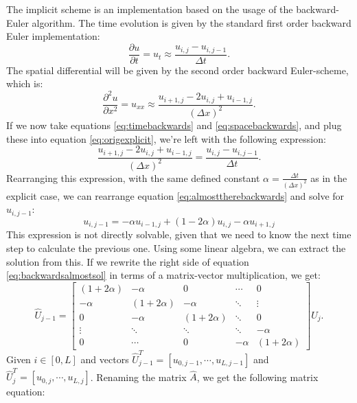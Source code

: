 \documentclass[reprint,english,notitlepage]{revtex4-1}  %
\begin{document}
The implicit scheme is an implementation based on the usage of the backward-Euler algorithm. The time evolution is given by the standard first order backward Euler implementation:
\begin{equation}\label{eq:timebackwards}
    \frac{\partial u}{\partial t} = u_t \approx \frac{u_{i,j} - u_{i,j-1}}{\Delta t}.
\end{equation}
The spatial differential will be given by the second order backward Euler-scheme, which is:
\begin{equation}\label{eq:spacebackwards}
    \frac{\partial^2 u}{\partial x^2} = u_{xx} \approx \frac{u_{i+1,j} - 2u_{i,j} + u_{i-1,j}}{(\Delta x)^2}.
\end{equation}
If we now take equations \ref{eq:timebackwards} and \ref{eq:spacebackwards}, and plug these into equation \ref{eq:origexplicit}, we're left with the following expression:
\begin{equation}\label{eq:almosttherebackwards}
    \frac{u_{i+1,j} - 2u_{i,j} + u_{i-1,j}}{(\Delta x)^2} = \frac{u_{i,j} - u_{i,j-1}}{\Delta t}.
\end{equation}
Rearranging this expression, with the same defined constant $\alpha = \frac{\Delta t}{(\Delta x)^2}$ as in the explicit case, we can rearrange equation \ref{eq:almosttherebackwards} and solve for $u_{i,j-1}$:
\begin{equation}\label{eq:backwardsalmostsol}
    u_{i,j-1} = -\alpha u_{i-1,j}+(1-2\alpha)u_{i,j} - \alpha u_{i+1,j}
\end{equation}
This expression is not directly solvable, given that we need to know the next time step to calculate the previous one. Using some linear algebra, we can extract the solution from this. If we rewrite the right side of equation \ref{eq:backwardsalmostsol} in terms of a matrix-vector multiplication, we get:
\begin{equation}\label{eq:implicitmatrixythingy}
    \hat{U}_{j-1} = \begin{bmatrix} (1+2\alpha) & -\alpha & 0 & \cdots & 0\\ -\alpha & (1+2\alpha) & -\alpha & \ddots & \vdots\\0&-\alpha&(1+2\alpha)&\ddots&0\\\vdots&\ddots&\ddots&\ddots&-\alpha\\0&\cdots&0&-\alpha&(1+2\alpha)\end{bmatrix} \hat{U}_j.
\end{equation}
Given $i \in [0,L]$ and vectors $\hat{U}_{j-1}^T = [u_{0,j-1},\cdots,u_{L,j-1}]$ and $\hat{U}_j^T = [u_{0,j},\cdots,u_{L,j}]$. Renaming the matrix $\hat{A}$, we get the following matrix equation:
\end{document}
